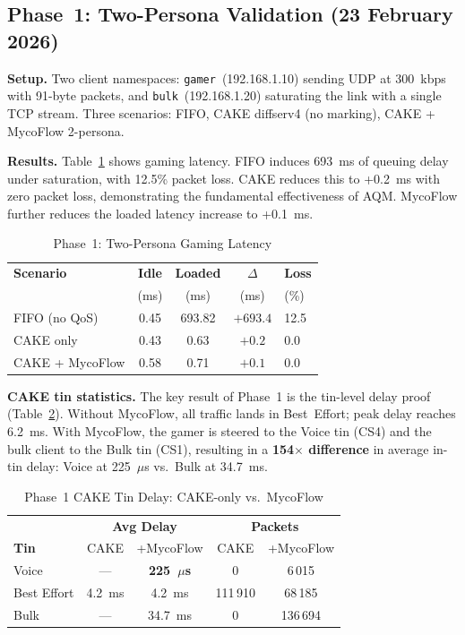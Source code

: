 \documentclass[conference]{IEEEtran}
\begin{document}
\subsection{Phase~1: Two-Persona Validation (23 February 2026)}

\textbf{Setup.}
Two client namespaces: \texttt{gamer}~(192.168.1.10) sending UDP at
300~kbps with 91-byte packets, and \texttt{bulk}~(192.168.1.20) saturating
the link with a single TCP stream.
Three scenarios: FIFO, CAKE diffserv4 (no marking), CAKE + MycoFlow 2-persona.

\textbf{Results.}
Table~\ref{tab:phase1} shows gaming latency.
FIFO induces 693~ms of queuing delay under saturation, with 12.5\% packet
loss.
CAKE reduces this to +0.2~ms with zero packet loss, demonstrating the
fundamental effectiveness of AQM.
MycoFlow further reduces the loaded latency increase to +0.1~ms.

\begin{table}[t]
\caption{Phase~1: Two-Persona Gaming Latency}
\label{tab:phase1}
\centering
\small
\begin{tabular}{lcccl}
\toprule
\textbf{Scenario} & \textbf{Idle} & \textbf{Loaded} & \textbf{$\Delta$} & \textbf{Loss} \\
 & (ms) & (ms) & (ms) & (\%) \\
\midrule
FIFO (no QoS)     & 0.45 & 693.82 & $+693.4$ & 12.5 \\
CAKE only         & 0.43 &   0.63 & $+0.2$   & 0.0  \\
CAKE + MycoFlow   & 0.58 &   0.71 & $+0.1$   & 0.0  \\
\bottomrule
\end{tabular}
\end{table}

\textbf{CAKE tin statistics.}
The key result of Phase~1 is the tin-level delay proof (Table~\ref{tab:tins1}).
Without MycoFlow, all traffic lands in Best~Effort; peak delay reaches 6.2~ms.
With MycoFlow, the gamer is steered to the Voice tin (CS4) and the bulk
client to the Bulk tin (CS1), resulting in a \textbf{154$\times$ difference}
in average in-tin delay: Voice at 225~$\mu$s vs.\ Bulk at 34.7~ms.

\begin{table}[t]
\caption{Phase~1 CAKE Tin Delay: CAKE-only vs.\ MycoFlow}
\label{tab:tins1}
\centering
\small
\begin{tabular}{lcccc}
\toprule
 & \multicolumn{2}{c}{\textbf{Avg Delay}} & \multicolumn{2}{c}{\textbf{Packets}} \\
\textbf{Tin} & CAKE & +MycoFlow & CAKE & +MycoFlow \\
\midrule
Voice       & —      & \textbf{225~$\mu$s} & 0      & 6\,015 \\
Best Effort & 4.2~ms & 4.2~ms              & 111\,910 & 68\,185 \\
Bulk        & —      & 34.7~ms             & 0      & 136\,694 \\
\bottomrule
\end{tabular}
\end{table}
\end{document}
